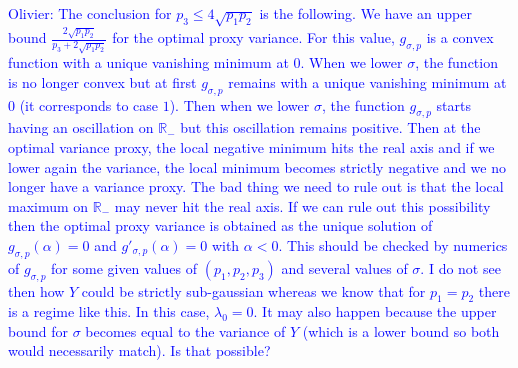 \documentclass[a4paper, 10pt]{article}
\theoremstyle{definition}
\begin{document}
\begin{itemize}
\begin{itemize}
\begin{enumerate}
             
        \end{enumerate}
\textcolor{blue}{Olivier: The conclusion for  $p_3\leq 4\sqrt{p_1p_2}$ is the following. We have an upper bound $\frac{2\sqrt{p_1p_2}}{p_3+2\sqrt{p_1p_2}}$  for the optimal proxy variance. For this value, $g_{\sigma,p}$ is a convex function with a unique vanishing minimum at $0$. When we lower $\sigma$, the function is no longer convex but at first $g_{\sigma,p}$ remains with a unique vanishing minimum at $0$ (it corresponds to case $1$). Then when we lower $\sigma$, the function $g_{\sigma,p}$ starts having an oscillation on $\mathbb{R}_-$ but this oscillation remains positive. Then at the optimal variance proxy, the local negative minimum hits the real axis and if we lower again the variance, the local minimum becomes strictly negative and we no longer have a variance proxy. The bad thing we need to rule out is that the local maximum on $\mathbb{R}_-$ may never hit the real axis. If we can rule out this possibility then the optimal proxy variance is obtained as the unique solution of $g_{\sigma,p}(\alpha)=0$ and $g'_{\sigma,p}(\alpha)=0$ with $\alpha<0$. This should be checked by numerics of $g_{\sigma,p}$ for some given values of $(p_1,p_2,p_3)$ and several values of $\sigma$. I do not see then how $Y$ could be strictly sub-gaussian whereas we know that for $p_1=p_2$ there is a regime like this. In this case, $\lambda_0=0$. It may also happen because the upper bound for $\sigma$ becomes equal to the variance of $Y$ (which is a lower bound so both would necessarily match). Is that possible?  } 
        \end{itemize}
        
  

\end{itemize}
\end{document}

